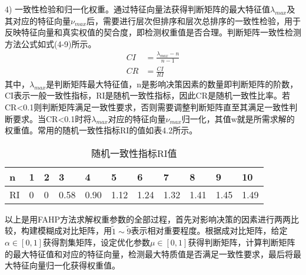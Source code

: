 4) 一致性检验和归一化权重。通过特征向量法获得判断矩阵的最大特征值$\lambda_{max}$及其对应的特征向量$\nu_{max}$后，需要进行层次但排序和层次总排序的一致性检验，用于反映特征向量和真实权值的契合度，即检测权重值是否合理。判断矩阵一致性检测方法公式如式(4-9)所示。
\begin{equation}
\begin{split}
CI &= \frac{\lambda_{max}-n}{n-1} \\
CR &= \frac{CI}{RI}
\end{split}
\end{equation}
其中，$\lambda_{max}$是判断矩阵最大特征值，n是影响决策因素的数量即判断矩阵的阶数，CI表示一般一致性指标，RI是随机一致性指标，因此CR是随机一致性比率。若CR<0.1则判断矩阵满足一致性要求，否则需要调整判断矩阵直至其满足一致性判断要求。当CR<0.1时将$\lambda_{max}$对应的特征向量$\nu_{max}$归一化，其值w就是所需求解的权重值。常用的随机一致性指标RI的值如表4.2所示。
\begin{table}[htbp]
	\caption{随机一致性指标RI值}
	\begin{center}
	\begin{tabular}{|p{0.8cm}<{\centering}|p{0.8cm}<{\centering}|p{0.8cm}<{\centering}|p{0.8cm}<{\centering}|p{0.8cm}<{\centering}|p{0.8cm}<{\centering}|p{0.8cm}<{\centering}|p{0.8cm}<{\centering}|p{0.8cm}<{\centering}|p{0.8cm}<{\centering}|p{0.8cm}<{\centering}|} \hline
	n & 1 & 2 & 3 & 4 & 5 & 6 & 7 & 8 & 9 & 10 \\ \hline
	RI & 0 & 0 & 0.58 & 0.90 & 1.12 & 1.24 & 1.32 & 1.41 & 1.45 & 1.49 \\ \hline
	\end{tabular}
\end{center}
\end{table}

以上是用FAHP方法求解权重参数的全部过程，首先对影响决策的因素进行两两比较，构建模糊成对比矩阵，用$\widetilde{1}\sim \widetilde{9}$表示相对重要程度。根据成对比矩阵，给定$\alpha\in[0,1]$获得割集矩阵，设定优化参数$\mu \in[0,1]$获得判断矩阵，计算判断矩阵的最大特征值和对应的特征向量，检测最大特质值是否满足一致性要求，最后将最大特征向量归一化获得权重值。

